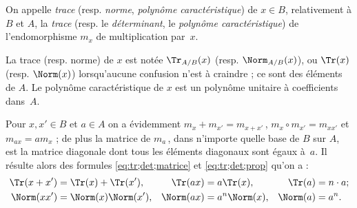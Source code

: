 \documentclass[11pt, %
  title in boldface,
  theorem in new line,
  theorem numbering = section,
  number theorems separately,
  simple name,
]{beaulivre}
\begin{document}
    \begin{definition}\label{def:trace;norme;polynôme caractéristique}
        On appelle \emph{trace} (resp. \emph{norme}, \emph{polynôme caractéristique}) de \( x \in B \), relativement à \( B \) et \( A \), la \emph{trace} (resp. le \emph{déterminant}, le \emph{polynôme caractéristique}) de l'endomorphisme \( m_x \) de multiplication par~\( x \).
    \end{definition}

    La trace (resp. norme) de \( x \) est notée \( \Tr_{A/B}(x) \) (resp. \( \Norm_{A/B}(x) \)), ou \( \Tr(x) \) (resp. \( \Norm(x) \)) lorsqu'aucune confusion n'est à craindre ; ce sont des éléments de \( A \). Le polynôme caractéristique de \( x \) est un polynôme unitaire à coefficients dans~\( A \).

    Pour \( x,x' \in B \) et \( a \in A \) on a évidemment \( m_x + m_{x'} = m_{x+x'} \)\,, \( m_x \circ m_{x'} = m_{x x'} \) et \( m_{ax} = a m_x \) ; de plus la matrice de \( m_a \)\,, dans n'importe quelle base de \( B \) sur \( A \), est la matrice diagonale dont tous les éléments diagonaux sont égaux à~\( a \). Il résulte alors des formules \eqref{eq:tr;det;matrice} et \eqref{eq:tr;det;prop} qu'on a :
    \begin{equation}
        \begin{alignedat}{5}
            \Tr(x+x') &= \Tr(x) + \Tr(x'),\quad &\Tr(ax)& &&= a\Tr(x), \quad &\Tr(a)& &&= n \cdot a ;\\
            \Norm(xx') &= \Norm(x)\Norm(x'), \quad &\Norm(ax)& &&= a^n \Norm(x), \quad &\Norm(a)& &&= a^n.
        \end{alignedat}
    \end{equation}
\end{document}
